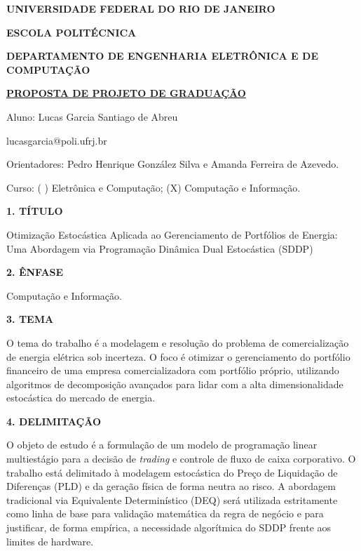 \documentclass[a4paper,12pt,oneside,openany]{report}
\begin{document}
\begin{center}
\textbf{UNIVERSIDADE FEDERAL DO RIO DE JANEIRO}
\vspace{-0.2cm}

\textbf{ESCOLA POLITÉCNICA}
\vspace{-0.2cm}

\textbf{DEPARTAMENTO DE ENGENHARIA ELETRÔNICA E DE COMPUTAÇÃO}
\vspace{0.8cm}

\underline{\textbf{PROPOSTA DE PROJETO DE GRADUAÇÃO}}

Aluno: Lucas Garcia Santiago de Abreu
\vspace{-0.2cm}

lucasgarcia@poli.ufrj.br 

Orientadores: Pedro Henrique González Silva e Amanda Ferreira de Azevedo. 

\vspace{0.2cm}

Curso: ( ) Eletrônica e Computação;  (X) Computação e Informação.
\end{center}


\textbf{1. TÍTULO}

Otimização Estocástica Aplicada ao Gerenciamento de Portfólios de Energia: Uma Abordagem via Programação Dinâmica Dual Estocástica (SDDP)

\vspace{0.4cm}
\textbf{2. ÊNFASE}

Computação e Informação.

\vspace{0.4cm}
\textbf{3. TEMA}

O tema do trabalho é a modelagem e resolução do problema de comercialização de energia elétrica sob incerteza. O foco é otimizar o gerenciamento do portfólio financeiro de uma empresa comercializadora com portfólio próprio, utilizando algoritmos de decomposição avançados para lidar com a alta dimensionalidade estocástica do mercado de energia.

\vspace{0.4cm}
\textbf{4. DELIMITAÇÃO}

O objeto de estudo é a formulação de um modelo de programação linear multiestágio para a decisão de \textit{trading} e controle de fluxo de caixa corporativo. O trabalho está delimitado à modelagem estocástica do Preço de Liquidação de Diferenças (PLD) e da geração física de forma neutra ao risco. A abordagem tradicional via Equivalente Determinístico (DEQ) será utilizada estritamente como linha de base para validação matemática da regra de negócio e para justificar, de forma empírica, a necessidade algorítmica do SDDP frente aos limites de hardware. 
\end{document}
